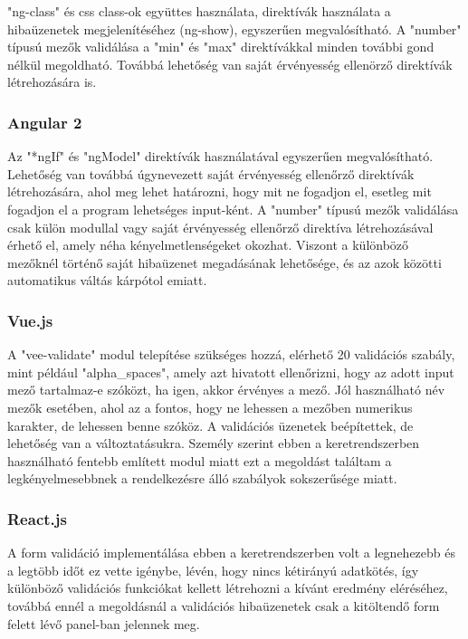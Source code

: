 "ng-class" és css class-ok együttes használata, direktívák használata a hibaüzenetek megjelenítéséhez (ng-show), egyszerűen megvalósítható. A "number" típusú mezők validálása a "min" és "max" direktívákkal minden további gond nélkül megoldható. Továbbá lehetőség van saját érvényesség ellenörző direktívák létrehozására is. 

\subsubsection{Angular 2}

Az "*ngIf" és "ngModel" direktívák használatával egyszerűen megvalósítható. Lehetőség van továbbá úgynevezett saját érvényesség ellenőrző direktívák létrehozására, ahol meg lehet határozni, hogy mit ne fogadjon el, esetleg mit fogadjon el a program lehetséges input-ként. A "number" típusú mezők validálása csak külön modullal vagy saját érvényesség ellenőrző direktíva létrehozásával érhető el, amely néha kényelmetlenségeket okozhat. Viszont a különböző mezőknél történő saját hibaüzenet megadásának lehetősége, és az azok közötti automatikus váltás kárpótol emiatt.

\subsubsection{Vue.js}

A "vee-validate" modul telepítése szükséges hozzá, elérhető 20 validációs szabály, mint például "alpha\_spaces", amely azt hivatott ellenőrizni, hogy az adott input mező tartalmaz-e szóközt, ha igen, akkor érvényes a mező. Jól használható név mezők esetében, ahol az a fontos, hogy ne lehessen a mezőben numerikus karakter, de lehessen benne szóköz. A validációs üzenetek beépítettek, de lehetőség van a változtatásukra. Személy szerint ebben a keretrendszerben használható fentebb említett modul miatt ezt a megoldást találtam a legkényelmesebbnek a rendelkezésre álló szabályok sokszerűsége miatt.

\subsubsection{React.js}

A form validáció implementálása ebben a keretrendszerben volt a legnehezebb és a legtöbb időt ez vette igénybe, lévén, hogy nincs kétirányú adatkötés, így különböző validációs funkciókat kellett létrehozni a kívánt eredmény eléréséhez, továbbá ennél a megoldásnál a validációs hibaüzenetek csak a kitöltendő form felett lévő panel-ban jelennek meg.

